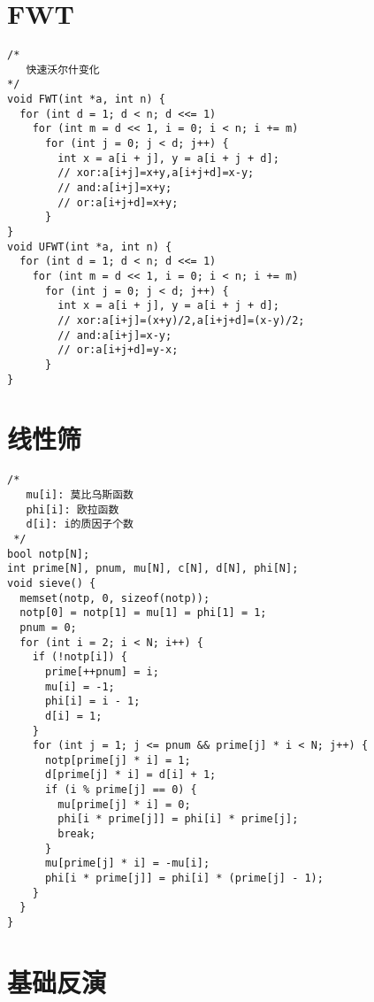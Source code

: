 \section{FWT}

\begin{lstlisting}
/*
   快速沃尔什变化
*/
void FWT(int *a, int n) {
  for (int d = 1; d < n; d <<= 1)
    for (int m = d << 1, i = 0; i < n; i += m)
      for (int j = 0; j < d; j++) {
        int x = a[i + j], y = a[i + j + d];
        // xor:a[i+j]=x+y,a[i+j+d]=x-y;
        // and:a[i+j]=x+y;
        // or:a[i+j+d]=x+y;
      }
}
void UFWT(int *a, int n) {
  for (int d = 1; d < n; d <<= 1)
    for (int m = d << 1, i = 0; i < n; i += m)
      for (int j = 0; j < d; j++) {
        int x = a[i + j], y = a[i + j + d];
        // xor:a[i+j]=(x+y)/2,a[i+j+d]=(x-y)/2;
        // and:a[i+j]=x-y;
        // or:a[i+j+d]=y-x;
      }
}

\end{lstlisting}

\section{线性筛}

\begin{lstlisting}
/*
   mu[i]: 莫比乌斯函数
   phi[i]: 欧拉函数
   d[i]: i的质因子个数
 */
bool notp[N];
int prime[N], pnum, mu[N], c[N], d[N], phi[N];
void sieve() {
  memset(notp, 0, sizeof(notp));
  notp[0] = notp[1] = mu[1] = phi[1] = 1;
  pnum = 0;
  for (int i = 2; i < N; i++) {
    if (!notp[i]) {
      prime[++pnum] = i;
      mu[i] = -1;
      phi[i] = i - 1;
      d[i] = 1;
    }
    for (int j = 1; j <= pnum && prime[j] * i < N; j++) {
      notp[prime[j] * i] = 1;
      d[prime[j] * i] = d[i] + 1;
      if (i % prime[j] == 0) {
        mu[prime[j] * i] = 0;
        phi[i * prime[j]] = phi[i] * prime[j];
        break;
      }
      mu[prime[j] * i] = -mu[i];
      phi[i * prime[j]] = phi[i] * (prime[j] - 1);
    }
  }
}

\end{lstlisting}

\section{基础反演}

